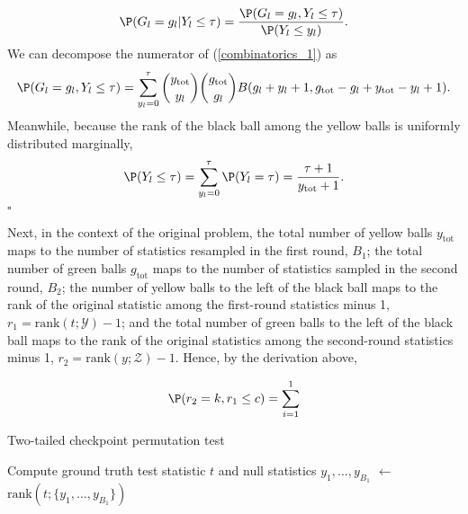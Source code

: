 \documentclass[12pt]{article}
\begin{document}
\begin{equation}\label{combinatorics_1}
\P(G_l = g_l | Y_l \leq \tau) = \frac{\P( G_l = g_l, Y_l \leq \tau)}{\P(Y_l \leq y_l)}.
\end{equation}
We can decompose the numerator of (\ref{combinatorics_1}) as
$$\P( G_l = g_l, Y_l \leq \tau) = \sum_{y_l=0}^\tau \binom{y_\textrm{tot}}{y_l} \binom{g_\textrm{tot}}{g_l} B(g_l + y_l + 1, g_\textrm{tot} - g_l + y_\textrm{tot} - y_l + 1).$$
Meanwhile, because the rank of the black ball among the yellow balls is uniformly distributed marginally,
$$\P(Y_l \leq \tau) = \sum_{y_l = 0}^\tau \P( Y_l = \tau ) =\frac{\tau + 1}{y_\textrm{tot} + 1} .$$ $\square$


Next, in the context of the original problem, the total number of yellow balls $y_\textrm{tot}$ maps to the number of statistics resampled in the first round, $B_1$; the total number of green balls $g_\textrm{tot}$ maps to the number of statistics sampled in the second round, $B_2$; the number of yellow balls to the left of the black ball maps to the rank of the original statistic among the first-round statistics minus 1, $r_1 = \textrm{rank}(t; \mathcal{Y}) - 1$; and the total number of green balls to the left of the black ball maps to the rank of the original statistics among the second-round statistics minus 1, $r_2 = \textrm{rank}(y; \mathcal{Z}) - 1.$ Hence, by the derivation above,

$$\P(r_2 = k , r_1 \leq c ) = \sum_{i=1}^1 $$


\begin{algorithm}
	  
	\caption{Two-tailed checkpoint permutation test}\label{alg:checkpoint_perm_two_sided}
	\BlankLine
	Compute ground truth test statistic $t$ and null statistics $y_1, \dots, y_{B_1}$\;
	\rankone $\leftarrow$ $\textrm{rank}(t; \{y_1, \dots, y_{B_1}\})$\;
\end{algorithm}





\end{document}
